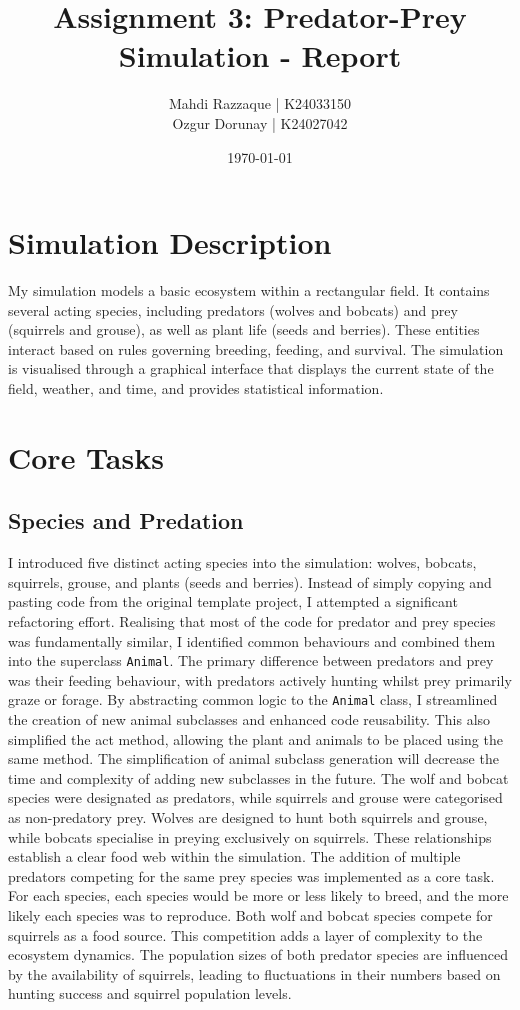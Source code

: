 \documentclass{article}
\title{Assignment 3: Predator-Prey Simulation - Report}
\author{
    Mahdi Razzaque | K24033150 \\
    Ozgur Dorunay | K24027042
}
\date{\today}
\begin{document}
\maketitle

\section{Simulation Description}

My simulation models a basic ecosystem within a rectangular field. It contains several acting species, including predators (wolves and bobcats) and prey (squirrels and grouse), as well as plant life (seeds and berries). These entities interact based on rules governing breeding, feeding, and survival. The simulation is visualised through a graphical interface that displays the current state of the field, weather, and time, and provides statistical information.

\section{Core Tasks}

\subsection{Species and Predation}

I introduced five distinct acting species into the simulation: wolves, bobcats, squirrels, grouse, and plants (seeds and berries). Instead of simply copying and pasting code from the original template project, I attempted a significant refactoring effort. Realising that most of the code for predator and prey species was fundamentally similar, I identified common behaviours and combined them into the superclass \texttt{Animal}. The primary difference between predators and prey was their feeding behaviour, with predators actively hunting whilst prey primarily graze or forage. By abstracting common logic to the \texttt{Animal} class, I streamlined the creation of new animal subclasses and enhanced code reusability. This also simplified the act method, allowing the plant and animals to be placed using the same method. The simplification of animal subclass generation will decrease the time and complexity of adding new subclasses in the future.
The wolf and bobcat species were designated as predators, while squirrels and grouse were categorised as non-predatory prey. Wolves are designed to hunt both squirrels and grouse, while bobcats specialise in preying exclusively on squirrels. These relationships establish a clear food web within the simulation. The addition of multiple predators competing for the same prey species was implemented as a core task. For each species, each species would be more or less likely to breed, and the more likely each species was to reproduce. Both wolf and bobcat species compete for squirrels as a food source. This competition adds a layer of complexity to the ecosystem dynamics. The population sizes of both predator species are influenced by the availability of squirrels, leading to fluctuations in their numbers based on hunting success and squirrel population levels.
\end{document}
